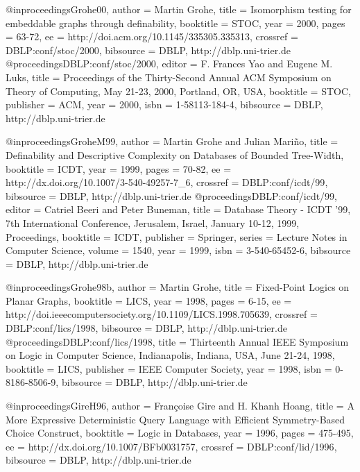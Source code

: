 \documentclass{article}
\begin{document}
@inproceedings{Grohe00,
  author    = {Martin Grohe},
  title     = {Isomorphism testing for embeddable graphs through definability},
  booktitle = {STOC},
  year      = {2000},
  pages     = {63-72},
  ee        = {http://doi.acm.org/10.1145/335305.335313},
  crossref  = {DBLP:conf/stoc/2000},
  bibsource = {DBLP, http://dblp.uni-trier.de}
}
@proceedings{DBLP:conf/stoc/2000,
  editor    = {F. Frances Yao and
               Eugene M. Luks},
  title     = {Proceedings of the Thirty-Second Annual ACM Symposium on
               Theory of Computing, May 21-23, 2000, Portland, OR, USA},
  booktitle = {STOC},
  publisher = {ACM},
  year      = {2000},
  isbn      = {1-58113-184-4},
  bibsource = {DBLP, http://dblp.uni-trier.de}
}

@inproceedings{GroheM99,
  author    = {Martin Grohe and
               Julian Mari{\~n}o},
  title     = {Definability and Descriptive Complexity on Databases of
               Bounded Tree-Width},
  booktitle = {ICDT},
  year      = {1999},
  pages     = {70-82},
  ee        = {http://dx.doi.org/10.1007/3-540-49257-7_6},
  crossref  = {DBLP:conf/icdt/99},
  bibsource = {DBLP, http://dblp.uni-trier.de}
}
@proceedings{DBLP:conf/icdt/99,
  editor    = {Catriel Beeri and
               Peter Buneman},
  title     = {Database Theory - ICDT '99, 7th International Conference,
               Jerusalem, Israel, January 10-12, 1999, Proceedings},
  booktitle = {ICDT},
  publisher = {Springer},
  series    = {Lecture Notes in Computer Science},
  volume    = {1540},
  year      = {1999},
  isbn      = {3-540-65452-6},
  bibsource = {DBLP, http://dblp.uni-trier.de}
}

@inproceedings{Grohe98b,
  author    = {Martin Grohe},
  title     = {Fixed-Point Logics on Planar Graphs},
  booktitle = {LICS},
  year      = {1998},
  pages     = {6-15},
  ee        = {http://doi.ieeecomputersociety.org/10.1109/LICS.1998.705639},
  crossref  = {DBLP:conf/lics/1998},
  bibsource = {DBLP, http://dblp.uni-trier.de}
}
@proceedings{DBLP:conf/lics/1998,
  title     = {Thirteenth Annual IEEE Symposium on Logic in Computer Science,
               Indianapolis, Indiana, USA, June 21-24, 1998},
  booktitle = {LICS},
  publisher = {IEEE Computer Society},
  year      = {1998},
  isbn      = {0-8186-8506-9},
  bibsource = {DBLP, http://dblp.uni-trier.de}
}

@inproceedings{GireH96,
  author    = {Fran\c{c}oise Gire and
               H. Khanh Hoang},
  title     = {A More Expressive Deterministic Query Language with Efficient
               Symmetry-Based Choice Construct},
  booktitle = {Logic in Databases},
  year      = {1996},
  pages     = {475-495},
  ee        = {http://dx.doi.org/10.1007/BFb0031757},
  crossref  = {DBLP:conf/lid/1996},
  bibsource = {DBLP, http://dblp.uni-trier.de}
}
\end{document}
